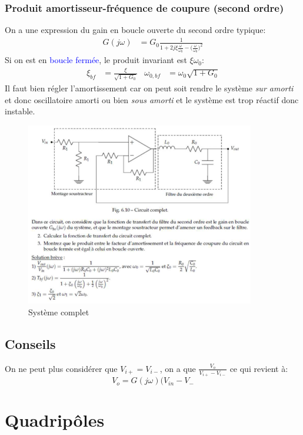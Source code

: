 \documentclass{report}
\begin{document}
\subsubsection{Produit amortisseur-fréquence de coupure (second ordre)}
On a une expression du gain en boucle ouverte du second ordre typique:
\begin{align*}
G(j \omega) &= G_0 \frac{1}{1 + 2 j \xi \frac{\omega}{\omega_0} - \Bigr( \frac{\omega}{\omega_0} \Bigr)^2}
\end{align*}
Si on est en \textcolor{blue}{boucle fermée}, le produit invariant est $\xi \omega_0$:
\begin{align*}
\xi_{bf} &= \frac{\xi}{\sqrt{1 + G_0}} & \omega_{0, bf} &= \omega_0 \sqrt{1 + G_0}
\end{align*}
Il faut bien régler l'amortissement car on peut soit rendre le système \textit{sur amorti} et donc oscillatoire amorti ou bien \textit{sous amorti} et le système est trop réactif donc instable. 
\begin{figure}[H]
\centering
\includegraphics[width=10cm]{img/amortissement.png}
\caption{Système complet}
\end{figure}

\subsection{Conseils}
On ne peut plus considérer que $V_{i+} = V_{i-}$, on a que $\frac{V_o}{V_{i+} - V_{i-}}$ ce qui revient à:
\begin{equation}
V_o = G(j \omega ) ( V_{in} - V_{-}
\end{equation}


\section{Quadripôles} \label{Quadri}
\end{document}
